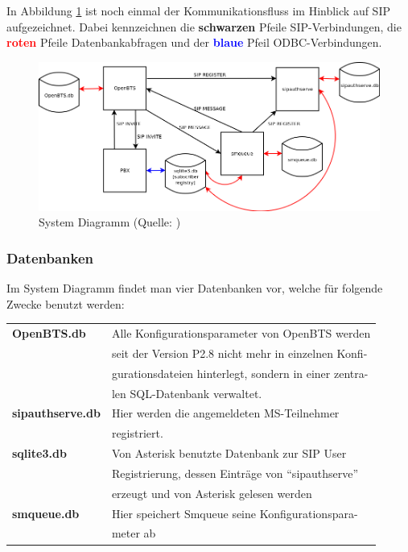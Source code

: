 In Abbildung \ref{fig:openbts_system_diagram} ist noch einmal der Kommunikationsfluss im Hinblick auf SIP aufgezeichnet. Dabei kennzeichnen die \textbf{schwarzen} Pfeile SIP-Verbindungen, die \textcolor{red}{\textbf{roten}} Pfeile Datenbankabfragen und der \textcolor{blue}{\textbf{blaue}} Pfeil ODBC-Verbindungen.

\begin{figure}[hbtp]
	\centering
		\includegraphics[width=1.00\textwidth]{img/openbts_system_diagram.png}
	\caption{System Diagramm (Quelle: \cite{bib:diagramm:openbts})}
	\label{fig:openbts_system_diagram}
\end{figure}
\subsubsection{Datenbanken}
Im System Diagramm findet man vier Datenbanken vor, welche für folgende Zwecke benutzt werden:

\begin{table}[h]
	\centering
		\begin{tabular}{ll}
			\textbf{OpenBTS.db} & Alle Konfigurationsparameter von OpenBTS werden\\
			& seit der Version P2.8 nicht mehr in einzelnen Konfi-\\
			& gurationsdateien hinterlegt, sondern in einer zentra-\\
			& len SQL-Datenbank verwaltet.\\
			\textbf{sipauthserve.db} & Hier werden die angemeldeten MS-Teilnehmer\\
			& registriert.\\
			\textbf{sqlite3.db} & Von Asterisk benutzte Datenbank zur SIP User\\ 
			& Registrierung, dessen Einträge von "`sipauthserve"'\\
			& erzeugt und von Asterisk gelesen werden\\
			 \textbf{smqueue.db} & Hier speichert Smqueue seine Konfigurationspara-\\
			 & meter ab\\
		\end{tabular}
\end{table}

